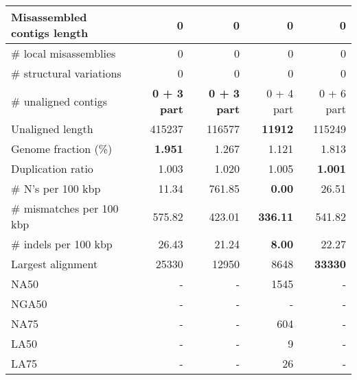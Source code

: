 \documentclass[12pt,a4paper]{article}
\begin{document}
\begin{table}[ht]
\begin{center}
\begin{tabular}{|l*{4}{|r}|}
Misassembled contigs length & 0 & 0 & 0 & 0 \\ \hline
\# local misassemblies & 0 & 0 & 0 & 0 \\ \hline
\# structural variations & 0 & 0 & 0 & 0 \\ \hline
\# unaligned contigs & {\bf 0 + 3 part} & {\bf 0 + 3 part} & 0 + 4 part & 0 + 6 part \\ \hline
Unaligned length & 415237 & 116577 & {\bf 11912} & 115249 \\ \hline
Genome fraction (\%) & {\bf 1.951} & 1.267 & 1.121 & 1.813 \\ \hline
Duplication ratio & 1.003 & 1.020 & 1.005 & {\bf 1.001} \\ \hline
\# N's per 100 kbp & 11.34 & 761.85 & {\bf 0.00} & 26.51 \\ \hline
\# mismatches per 100 kbp & 575.82 & 423.01 & {\bf 336.11} & 541.82 \\ \hline
\# indels per 100 kbp & 26.43 & 21.24 & {\bf 8.00} & 22.27 \\ \hline
Largest alignment & 25330 & 12950 & 8648 & {\bf 33330} \\ \hline
NA50 & - & - & 1545 & - \\ \hline
NGA50 & - & - & - & - \\ \hline
NA75 & - & - & 604 & - \\ \hline
LA50 & - & - & 9 & - \\ \hline
LA75 & - & - & 26 & - \\ \hline
\end{tabular}
\end{center}
\end{table}
\end{document}
